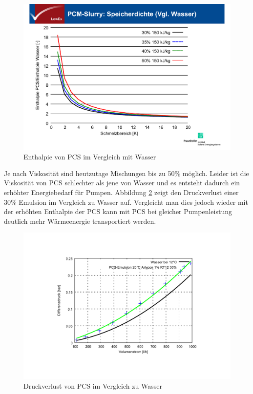 \documentclass[11pt,a4paper]{scrartcl}
\begin{document}
\begin{figure}[h!]
\begin{center}
\includegraphics[scale=0.4]{images/Henning1.pdf}
\caption{Enthalpie von PCS im Vergleich mit Wasser \cite{Henning}}
\label{fig:PCSWasser}
\end{center}
\end{figure}
Je nach Viskosität sind heutzutage Mischungen bis zu 50\% möglich. Leider ist
die Viskosität von PCS schlechter als jene von Wasser und es entsteht dadurch
ein erhöhter Energiebedarf für Pumpen. Abbildung \ref{fig:PCSDruck} zeigt den
Druckverlust einer 30\% Emulsion im Vergleich zu Wasser auf. Vergleicht man dies
jedoch wieder mit der erhöhten Enthalpie der PCS kann mit PCS bei gleicher
Pumpenleistung deutlich mehr Wärmeenergie transportiert werden.

\begin{figure}[h!]
\begin{center}
\includegraphics[scale=0.4]{images/Henning2.pdf}
\caption{Druckverlust von PCS im Vergleich zu Wasser \cite{Henning}}
\label{fig:PCSDruck}
\end{center}
\end{figure}
\end{document}
